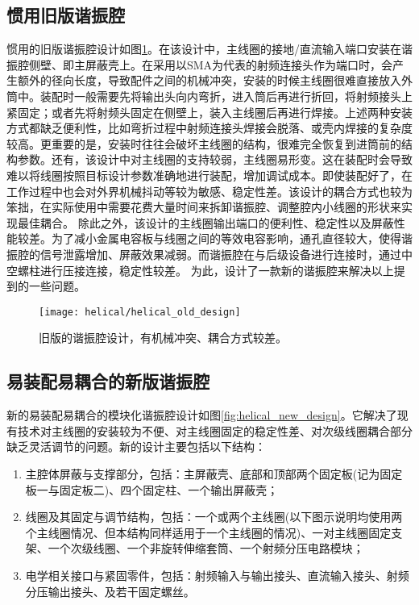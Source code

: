 \subsection[惯用旧版谐振腔]{惯用旧版谐振腔}
惯用的旧版谐振腔设计如图\ref{fig:helical_old_design}。在该设计中，主线圈的接地/直流输入端口安装在谐振腔侧壁、即主屏蔽壳上。在采用以SMA为代表的射频连接头作为端口时，会产生额外的径向长度，导致配件之间的机械冲突，安装的时候主线圈很难直接放入外筒中。装配时一般需要先将输出头向内弯折，进入筒后再进行折回，将射频接头上紧固定；或者先将射频头固定在侧壁上，装入主线圈后再进行焊接。上述两种安装方式都缺乏便利性，比如弯折过程中射频连接头焊接会脱落、或壳内焊接的复杂度较高。更重要的是，安装时往往会破坏主线圈的结构，很难完全恢复到进筒前的结构参数。还有，该设计中对主线圈的支持较弱，主线圈易形变。这在装配时会导致难以将线圈按照目标设计参数准确地进行装配，增加调试成本。即使装配好了，在工作过程中也会对外界机械抖动等较为敏感、稳定性差。该设计的耦合方式也较为笨拙，在实际使用中需要花费大量时间来拆卸谐振腔、调整腔内小线圈的形状来实现最佳耦合。
除此之外，该设计的主线圈输出端口的便利性、稳定性以及屏蔽性能较差。为了减小金属电容板与线圈之间的等效电容影响，通孔直径较大，使得谐振腔的信号泄露增加、屏蔽效果减弱。而谐振腔在与后级设备进行连接时，通过中空螺柱进行压接连接，稳定性较差。
为此，设计了一款新的谐振腔来解决以上提到的一些问题。

\begin{figure}
    \centering
    \texttt{[image: helical/helical\_old\_design]}
    \caption[旧版的谐振腔设计]{旧版的谐振腔设计，有机械冲突、耦合方式较差。\label{fig:helical_old_design}}
\end{figure}
\subsection[易装配易耦合的新版谐振腔]{易装配易耦合的新版谐振腔}
新的易装配易耦合的模块化谐振腔设计如图\ref{fig:helical_new_design}。它解决了现有技术对主线圈的安装较为不便、对主线圈固定的稳定性差、对次级线圈耦合部分缺乏灵活调节的问题。新的设计主要包括以下结构：
\begin{enumerate}
    \item 主腔体屏蔽与支撑部分，包括：主屏蔽壳、底部和顶部两个固定板(记为固定板一与固定板二)、四个固定柱、一个输出屏蔽壳；
    \item 线圈及其固定与调节结构，包括：一个或两个主线圈(以下图示说明均使用两个主线圈情况、但本结构同样适用于一个主线圈的情况)、一对主线圈固定支架、一个次级线圈、一个非旋转伸缩套筒、一个射频分压电路模块；
    \item 电学相关接口与紧固零件，包括：射频输入与输出接头、直流输入接头、射频分压输出接头、及若干固定螺丝。
\end{enumerate}

